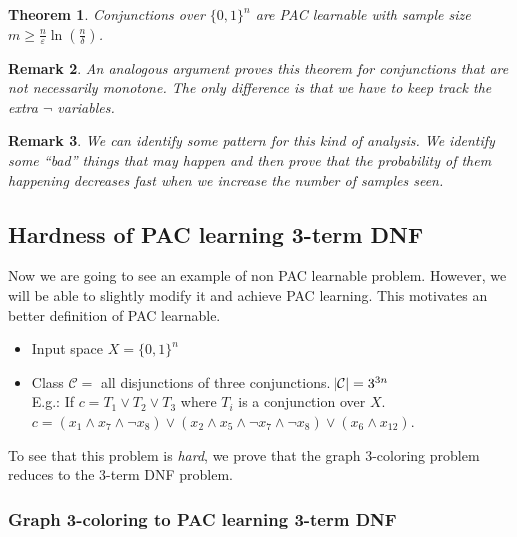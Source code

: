 \documentclass[12pt, letterpaper]{article}
\numberwithin{equation}{section} %
\newcommand{\mc}{\mathcal}
\newcommand{\ve}{\varepsilon}
\newtheorem{theorem}{Theorem}[section]
\newtheorem{remark}[theorem]{Remark}
\theoremstyle{definition}
\theoremstyle{remark}
\begin{document}
\begin{theorem}
    Conjunctions over $\lbrace 0,1 \rbrace^n$ are PAC learnable with sample size  $m \geq \frac n\ve \ln\left(\frac n\delta\right)$.
\end{theorem}

\begin{remark}
    An analogous argument proves this theorem for conjunctions that are not necessarily monotone. 
    The only difference is that we have to keep track the extra $\lnot$ variables.
\end{remark}

\begin{remark}
    We can identify some pattern for this kind of analysis. 
    We identify some ``bad'' things that may happen and then prove that the probability of them happening decreases fast when we increase the number of samples seen.
\end{remark}


\subsection{Hardness of PAC learning 3-term DNF}

Now we are going to see an example of non PAC learnable problem. 
However, we will be able to slightly modify it and achieve PAC learning. 
This motivates an better definition of PAC learnable.
\begin{itemize}
    \item Input space $X = \lbrace 0, 1 \rbrace^n$
    \item Class $\mc C = $ all disjunctions of three conjunctions. $\abs{\mc C} = 3^{3n}$\\
          E.g.: If $c = T_1 \lor T_2 \lor T_3$ where $T_i$ is a conjunction over $X$.\\
          $c = \left(x_1 \wedge x_7 \wedge \lnot x_8 \right) \lor \left(x_2 \wedge x_5 \wedge \lnot x_7 \wedge \lnot x_8\right) \lor \left(x_6 \wedge x_{12}\right)$.
\end{itemize}
To see that this problem is \emph{hard}, we prove that the graph 3-coloring problem reduces to the 3-term DNF problem. 

\subsubsection*{Graph 3-coloring to PAC learning 3-term DNF}
\end{document}
